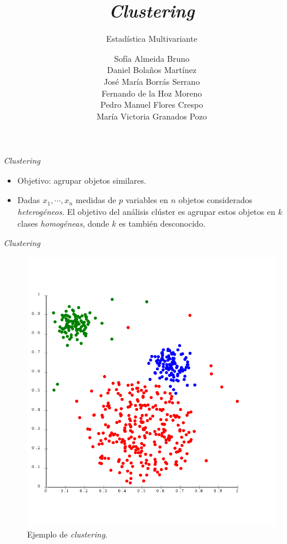 \documentclass[spanish]{beamer}
\title{\textit{Clustering}}
\subtitle{Estadística Multivariante}
\author{Sofía Almeida Bruno\\ Daniel Bolaños Martínez\\ José María Borrás Serrano\\ Fernando de la Hoz Moreno\\ Pedro Manuel Flores Crespo\\ María Victoria Granados Pozo}
\begin{document}
\maketitle
	
\begin{frame}{\textit{Clustering}}
  \begin{itemize}
  \item Objetivo: agrupar objetos similares.
  \item Dadas \textbf{$x_1$}$,\cdots, $\textbf{$x_n$} medidas de $p$ variables en $n$ objetos considerados \textit{heterogéneos}. El objetivo del análisis clúster es agrupar estos objetos en $k$ clases \textit{homogéneas}, donde $k$ es también desconocido.
  \end{itemize}
\end{frame}

\begin{frame}{\textit{Clustering}}
\begin{figure}[H]
	\centering
	\includegraphics[scale=0.2]{ejemplo}
	\caption{Ejemplo de \textit{clustering}. \cite{chire_deutsch:_2011}}
	\label{fig:ejemplo1}
\end{figure}
\end{frame}
\end{document}

